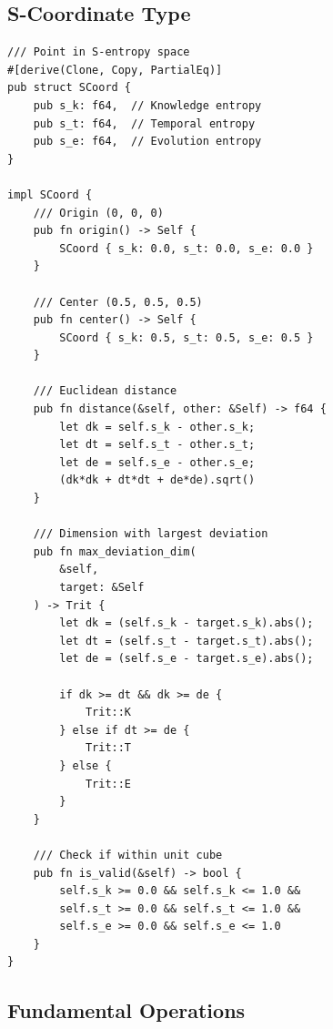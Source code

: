 \documentclass[twocolumn,10pt]{article}
\theoremstyle{remark}
\begin{document}
\subsection{S-Coordinate Type}

\begin{lstlisting}[style=rust]
/// Point in S-entropy space
#[derive(Clone, Copy, PartialEq)]
pub struct SCoord {
    pub s_k: f64,  // Knowledge entropy
    pub s_t: f64,  // Temporal entropy
    pub s_e: f64,  // Evolution entropy
}

impl SCoord {
    /// Origin (0, 0, 0)
    pub fn origin() -> Self {
        SCoord { s_k: 0.0, s_t: 0.0, s_e: 0.0 }
    }

    /// Center (0.5, 0.5, 0.5)
    pub fn center() -> Self {
        SCoord { s_k: 0.5, s_t: 0.5, s_e: 0.5 }
    }

    /// Euclidean distance
    pub fn distance(&self, other: &Self) -> f64 {
        let dk = self.s_k - other.s_k;
        let dt = self.s_t - other.s_t;
        let de = self.s_e - other.s_e;
        (dk*dk + dt*dt + de*de).sqrt()
    }

    /// Dimension with largest deviation
    pub fn max_deviation_dim(
        &self,
        target: &Self
    ) -> Trit {
        let dk = (self.s_k - target.s_k).abs();
        let dt = (self.s_t - target.s_t).abs();
        let de = (self.s_e - target.s_e).abs();

        if dk >= dt && dk >= de {
            Trit::K
        } else if dt >= de {
            Trit::T
        } else {
            Trit::E
        }
    }

    /// Check if within unit cube
    pub fn is_valid(&self) -> bool {
        self.s_k >= 0.0 && self.s_k <= 1.0 &&
        self.s_t >= 0.0 && self.s_t <= 1.0 &&
        self.s_e >= 0.0 && self.s_e <= 1.0
    }
}
\end{lstlisting}

\subsection{Fundamental Operations}
\end{document}
